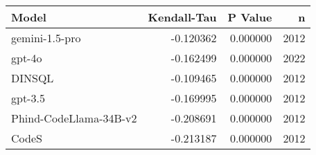 \begin{tabular}{lrrr}
\toprule
Model & Kendall-Tau & P Value & n \\
\midrule
gemini-1.5-pro & -0.120362 & 0.000000 & 2012 \\
gpt-4o & -0.162499 & 0.000000 & 2022 \\
DINSQL & -0.109465 & 0.000000 & 2012 \\
gpt-3.5 & -0.169995 & 0.000000 & 2012 \\
Phind-CodeLlama-34B-v2 & -0.208691 & 0.000000 & 2012 \\
CodeS & -0.213187 & 0.000000 & 2012 \\
\bottomrule
\end{tabular}

